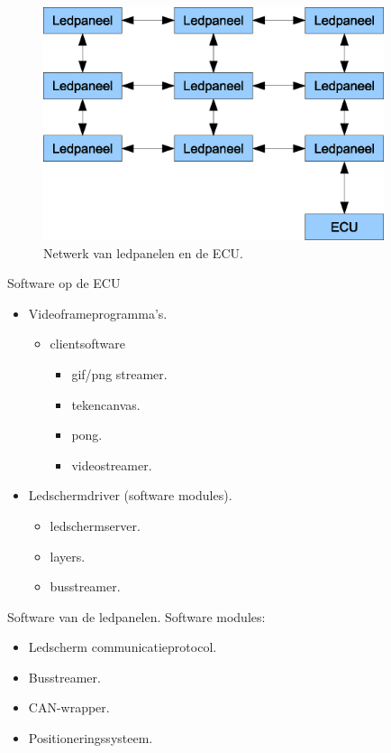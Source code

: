 \begin{frame}
	\begin{figure}[h]
		\centering
		\includegraphics[width=10cm]{figuren/bussysteem}
		\caption{Netwerk van ledpanelen en de ECU.}
	\end{figure}
\end{frame}

\begin{frame}{Software op de ECU}
	\begin{itemize}
		\item Videoframeprogramma's.
			\begin{itemize}
				\item clientsoftware
					\begin{itemize}
						\item gif/png streamer.
						\item tekencanvas.
						\item pong.
						\item videostreamer.
					\end{itemize}
			\end{itemize}
		\item Ledschermdriver (software modules).
			\begin{itemize}
				\item ledschermserver.
				\item layers.
				\item busstreamer.
			\end{itemize}
	\end{itemize}
\end{frame}

\begin{frame}{Software van de ledpanelen.}
	Software modules:
	\begin{itemize}
		\item Ledscherm communicatieprotocol.
		\item Busstreamer.
		\item CAN-wrapper.
		\item Positioneringssysteem.
	\end{itemize}
\end{frame}

